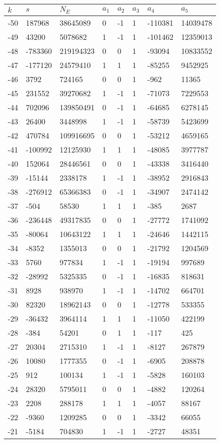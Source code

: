 \documentclass{amsart}
\begin{document}
\begin{longtable}{|l|l|l|lllll|}
\hline
$k$ & $s$ & $N_E$ & $a_1$ & $a_2$ & $a_3$ & $a_4$ & $a_5$\\
\hline
-50&187968&38645089&0&-1&1&-110381&14039478\\
-49&43200&5078682&1&-1&1&-101462&12359013\\
-48&-783360&219194323&0&0&1&-93094&10833552\\
-47&-177120&24579410&1&1&1&-85255&9452925\\
-46&3792&724165&0&0&1&-962&11365\\
-45&231552&39270682&1&-1&1&-71073&7229553\\
-44&702096&139850491&0&-1&1&-64685&6278145\\
-43&26400&3448998&1&-1&1&-58739&5423699\\
-42&470784&109916695&0&0&1&-53212&4659165\\
-41&-100992&12125930&1&1&1&-48085&3977787\\
-40&152064&28446561&0&0&1&-43338&3416440\\
-39&-15144&2338178&1&-1&1&-38952&2916843\\
-38&-276912&65366383&0&-1&1&-34907&2474142\\
-37&-504&58530&1&1&1&-385&2687\\
-36&-236448&49317835&0&0&1&-27772&1741092\\
-35&-80064&10643122&1&1&1&-24646&1442115\\
-34&-8352&1355013&0&0&1&-21792&1204569\\
-33&5760&977834&1&-1&1&-19194&997689\\
-32&-28992&5325335&0&-1&1&-16835&818631\\
-31&8928&938970&1&-1&1&-14702&664701\\
-30&82320&18962143&0&0&1&-12778&533355\\
-29&-36432&3964114&1&1&1&-11050&422199\\
-28&-384&54201&0&1&1&-117&425\\
-27&20304&2715310&1&-1&1&-8127&267879\\
-26&10080&1777355&0&-1&1&-6905&208878\\
-25&912&100134&1&-1&1&-5828&160103\\
-24&28320&5795011&0&0&1&-4882&120264\\
-23&2208&288178&1&1&1&-4057&88167\\
-22&-9360&1209285&0&0&1&-3342&66055\\
-21&-5184&704830&1&-1&1&-2727&48351\\

\end{longtable}
\end{document}
